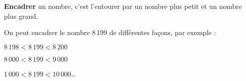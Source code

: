 \begin{definition}
 {\bf Encadrer} un nombre, c'est l'entourer par un nombre plus petit et un nombre plus grand.
\end{definition}

\begin{exemple*1}
   On peut encadrer le nombre 8\,199 de différentes façons, par exemple :
   \begin{colitemize}{3}
     \item $8\,198<8\,199<8\,200$
     \item $8\,000<8\,199<9\,000$
     \item $1\,000<8\,199<10\,000$\dots
   \end{colitemize}
\end{exemple*1}


\exercicesbase

